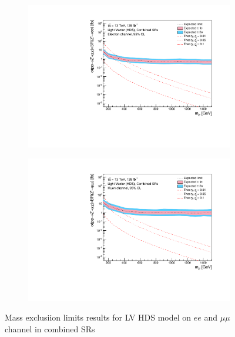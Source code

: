 \documentclass[12pt, a4paper]{book}
\begin{document}
\begin{figure}[!ht]
	\centering
	\begin{subfigure}[b]{0.49\textwidth}
      \centering
      \includegraphics[width=1\textwidth]{Limits/Model_independent/LV_HDS/mass_exclusion_ee.pdf}
   \end{subfigure}
   \hfill
   \begin{subfigure}[b]{0.49\textwidth}
      \centering
      \includegraphics[width=1\textwidth]{Limits/Model_independent/LV_HDS/mass_exclusion_uu.pdf}
   \end{subfigure}
   \caption{Mass exclusiion limits results for LV HDS model on $ee$ and $\mu\mu$ channel in combined SRs}\label{fig:LV_HDS_me_comb}
\end{figure}
\clearpage
\end{document}
